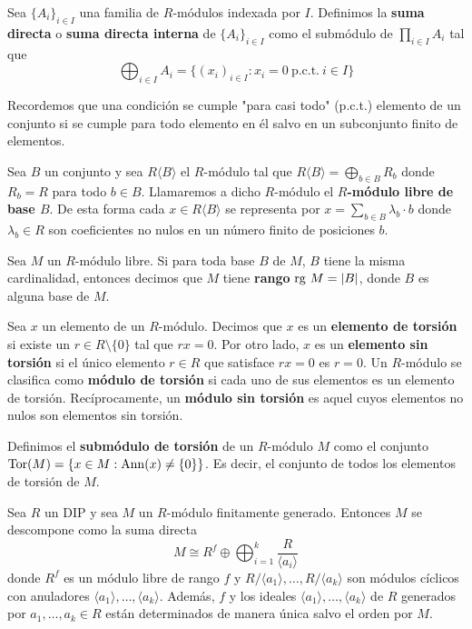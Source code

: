 \begin{definicion}
	Sea \(\{A_{i}\}_{i \in I}\) una familia de \(R\)-módulos indexada por \(I\).
	Definimos la \textbf{suma directa} o \textbf{suma directa interna} de
	\(\{A_{i}\}_{i \in I}\) como el submódulo de \(\prod_{i \in I}A_{i}\) tal que
	\[
		\bigoplus_{i \in I}A_{i} = \{(x_{i})_{i \in I}: x_{i} = 0 \ \text{p.c.t.}\ i
		\in I\}
	\]
\end{definicion}
\begin{nota}
	Recordemos que una condición se cumple "para casi todo" (p.c.t.) elemento de
	un conjunto si se cumple para todo elemento en él salvo en un subconjunto
	finito de elementos.
\end{nota}
\begin{definicion}
	Sea \(B\) un conjunto y sea \(R \langle B \rangle\) el \(R\)-módulo tal que \(R \langle
	B \rangle = \bigoplus_{b \in B}R_{b}\) donde \(R_{b}=R\) para todo \(b \in B\).
	Llamaremos a dicho \(R\)-módulo el \textbf{\(R\)-módulo libre de base \(B\)}. De
	esta forma cada \(x \in R \langle B \rangle\) se representa por
	\(x = \sum_{b\in B}\lambda_{b} \cdot b\) donde \(\lambda_{b} \in R\) son
	coeficientes no nulos en un número finito de posiciones \(b\).
\end{definicion}
\begin{definicion}
	Sea \(M\) un \(R\)-módulo libre. Si para toda base \(B\) de \(M\), \(B\) tiene la misma cardinalidad,
	entonces decimos que \(M\) tiene \textbf{rango} \(\operatorname{rg} \, M = |B|\), donde \(B\) es
	alguna base de \(M\).
\end{definicion}
\begin{definicion}
	Sea \(x\) un elemento de un \(R\)-módulo. Decimos que \(x\) es un\textbf{ elemento de
	torsión} si existe un \(r \in R \setminus \{0\}\) tal que \(rx = 0\). Por otro lado,
	\(x\) es un \textbf{elemento sin torsión} si el único elemento \(r \in R\) que satisface
	\(rx = 0\) es \(r = 0\). Un \(R\)-módulo se clasifica como \textbf{módulo de torsión}
	si cada uno de sus elementos es un elemento de torsión. Recíprocamente, un \textbf{módulo
	sin torsión} es aquel cuyos elementos no nulos son elementos sin torsión.
\end{definicion}
\begin{definicion}
	Definimos el \textbf{submódulo de torsión} de un \(R\)-módulo \(M\) como el
	conjunto \(\operatorname{Tor}(M)= \{x \in M : \operatorname{Ann}(x) \neq \{0\}\}\). Es decir, el conjunto de
	todos los elementos de torsión de \(M\).
\end{definicion}
\begin{teorema}
	 Sea \(R\) un DIP y sea \(M\) un \(R\)-módulo finitamente
	generado. Entonces \(M\) se descompone como la suma directa
	\[
		M \cong R^{f} \oplus \bigoplus_{i = 1}^{k} \frac{R}{\langle a_{i} \rangle}
	\]
	donde \(R^{f}\) es un módulo libre de rango \(f\) y
	\(R/\langle a_{1} \rangle, \ldots, R/\langle a_{k} \rangle\) son módulos cíclicos
	con anuladores \(\langle a_{1} \rangle, \ldots, \langle a_{k} \rangle\). Además,
	\(f\) y los ideales \(\langle a_{1} \rangle, \ldots, \langle a_{k} \rangle\) de \(R\)
	generados por \(a_{1}, \ldots, a_{k} \in R\) están determinados de manera única
	salvo el orden por \(M\).
\end{teorema}
